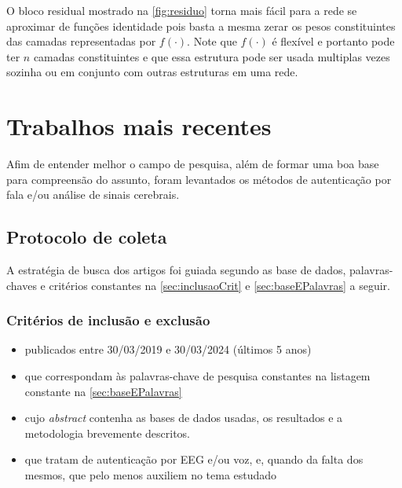 				\par O bloco residual mostrado na \autoref{fig:residuo} torna mais fácil para a rede se aproximar de funções identidade pois basta a mesma zerar os pesos constituintes das camadas representadas por $f(\cdot)$. Note que $f(\cdot)$ é flexível e portanto pode ter $n$ camadas constituintes e que essa estrutura pode ser usada multiplas vezes sozinha ou em conjunto com outras estruturas em uma rede.

	\section{Trabalhos mais recentes}
		\label{sec:trabalhosMaisRecentes}
	
		\par Afim de entender melhor o campo de pesquisa, além de formar uma boa base para compreensão do assunto, foram levantados os métodos de autenticação por fala e/ou análise de sinais cerebrais.
		
		\subsection{Protocolo de coleta}
		
			\par A estratégia de busca dos artigos foi guiada segundo as base de dados, palavras-chaves e critérios constantes na \autoref{sec:inclusaoCrit} e \autoref{sec:baseEPalavras} a seguir.
		
			\subsubsection{Critérios de inclusão e exclusão}
			\label{sec:inclusaoCrit}
			\begin{itemize}
				\item publicados entre 30/03/2019 e 30/03/2024 (últimos 5 anos)
				\item que correspondam às palavras-chave de pesquisa constantes na listagem constante na \autoref{sec:baseEPalavras}
				\item cujo \textit{abstract} contenha as bases de dados usadas, os resultados e a metodologia brevemente descritos.
				\item que tratam de autenticação por EEG e/ou voz, e, quando da falta dos mesmos, que pelo menos auxiliem no tema estudado
			\end{itemize}
			
			
